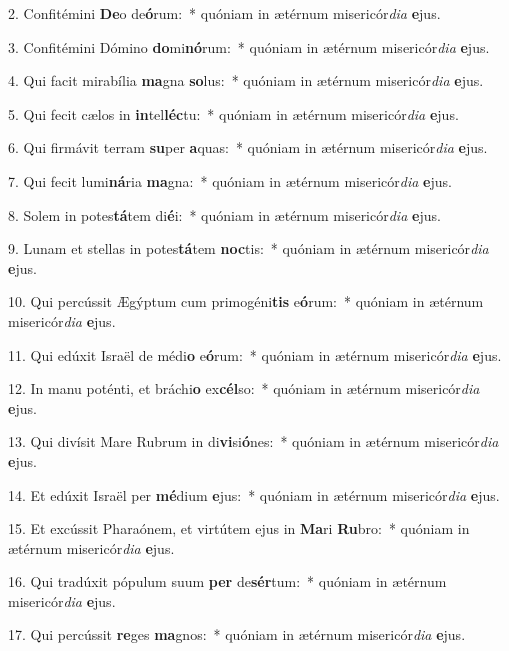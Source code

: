 2. Confitémini \textbf{De}o de\textbf{ó}rum:~*  quóniam in ætérnum misericór\textit{di}\textit{a} \textbf{e}jus.\

3. Confitémini Dómino \textbf{do}mi\textbf{nó}rum:~*  quóniam in ætérnum misericór\textit{di}\textit{a} \textbf{e}jus.\

4. Qui facit mirabília \textbf{ma}gna \textbf{so}lus:~*  quóniam in ætérnum misericór\textit{di}\textit{a} \textbf{e}jus.\

5. Qui fecit cælos in \textbf{in}tel\textbf{léc}tu:~*  quóniam in ætérnum misericór\textit{di}\textit{a} \textbf{e}jus.\

6. Qui firmávit terram \textbf{su}per \textbf{a}quas:~*  quóniam in ætérnum misericór\textit{di}\textit{a} \textbf{e}jus.\

7. Qui fecit lumi\textbf{ná}ria \textbf{ma}gna:~*  quóniam in ætérnum misericór\textit{di}\textit{a} \textbf{e}jus.\

8. Solem in potes\textbf{tá}tem di\textbf{é}i:~*  quóniam in ætérnum misericór\textit{di}\textit{a} \textbf{e}jus.\

9. Lunam et stellas in potes\textbf{tá}tem \textbf{noc}tis:~*  quóniam in ætérnum misericór\textit{di}\textit{a} \textbf{e}jus.\

10. Qui percússit Ægýptum cum primogéni\textbf{tis} e\textbf{ó}rum:~*  quóniam in ætérnum misericór\textit{di}\textit{a} \textbf{e}jus.\

11. Qui edúxit Israël de médi\textbf{o} e\textbf{ó}rum:~*  quóniam in ætérnum misericór\textit{di}\textit{a} \textbf{e}jus.\

12. In manu poténti, et bráchi\textbf{o} ex\textbf{cél}so:~*  quóniam in ætérnum misericór\textit{di}\textit{a} \textbf{e}jus.\

13. Qui divísit Mare Rubrum in di\textbf{vi}si\textbf{ó}nes:~*  quóniam in ætérnum misericór\textit{di}\textit{a} \textbf{e}jus.\

14. Et edúxit Israël per \textbf{mé}dium \textbf{e}jus:~*  quóniam in ætérnum misericór\textit{di}\textit{a} \textbf{e}jus.\

15. Et excússit Pharaónem, et virtútem ejus in \textbf{Ma}ri \textbf{Ru}bro:~*  quóniam in ætérnum misericór\textit{di}\textit{a} \textbf{e}jus.\

16. Qui tradúxit pópulum suum \textbf{per} de\textbf{sér}tum:~*  quóniam in ætérnum misericór\textit{di}\textit{a} \textbf{e}jus.\

17. Qui percússit \textbf{re}ges \textbf{ma}gnos:~*  quóniam in ætérnum misericór\textit{di}\textit{a} \textbf{e}jus.\

